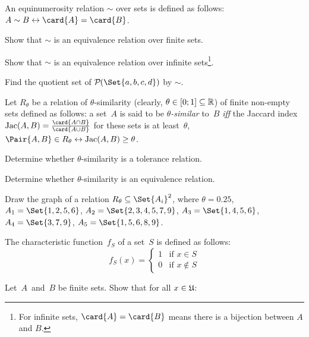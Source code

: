 \documentclass[a4paper,12pt]{article}
\newcommand{\Jac}{%
    \mathrm{Jac}}
\begin{document}
\begin{tasks}
    \item An equinumerosity relation $\sim$ over sets is defined as follows: $A \sim B \iff \card{A} =\nobreak \card{B}$.

    \begin{subtasks}
        \item Show that $\sim$ is an equivalence relation over finite sets.
        \item Show that $\sim$ is an equivalence relation over infinite sets\footnote{For infinite sets, $\card{A} = \card{B}$ means there is a bijection between $A$ and $B$.}.
        \item Find the quotient set of $\powerset{\Set{a,b,c,d}}$ by $\sim$.
    \end{subtasks}


    \item Let $R_{\theta}$ be a relation of $\theta$-similarity (clearly, $\theta \in [0; 1] \subseteq \mathbb{R}$) of finite non-empty sets defined as follows: a set~$A$ is said to be \textit{$\theta$-similar} to~$B$ \textit{iff} the Jaccard index $\Jac(A,B) = \frac{\card{A \intersection B}}{\card{A \union B}}$ for these sets is at least~$\theta$, \ie $\Pair{A, B} \in R_{\theta} \iff \Jac(A,B) \geq \theta$.

    \begin{subtasks}
        \item Determine whether $\theta$-similarity is a tolerance relation.
        \item Determine whether $\theta$-similarity is an equivalence relation.
        \item Draw the graph of a relation $R_{\theta} \subseteq \Set{A_i}^2$, where $\theta = 0.25$, $A_1 = \Set{1,2,5,6}$, $A_2 = \Set{2,3,4,5,7,9}$, $A_3 = \Set{1,4,5,6}$, $A_4 = \Set{3,7,9}$, $A_5 = \Set{1,5,6,8,9}$.
    \end{subtasks}


    \item The characteristic function~$f_S$ of a set~$S$ is defined as follows:
    \[
        f_S(x) = \begin{cases}
            1 &\text{if } x \in S \\
            0 &\text{if } x \notin S
        \end{cases}
    \]

    Let~$A$~and~$B$ be finite sets.
    Show that for all $x \in \mathfrak{U}$:


\end{tasks}
\end{document}
